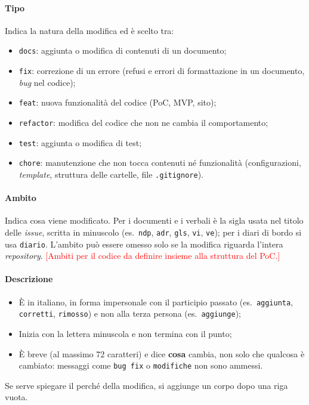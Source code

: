 \documentclass[12pt,a4paper]{article}
\newcommand{\ph}[1]{\textcolor{red}{[#1]}}
\newcommand{\tightlist}{\setlength{\itemsep}{1pt}\setlength{\parskip}{0pt}}
\begin{document}
\paragraph{Tipo}
Indica la natura della modifica ed è scelto tra:
\begin{itemize}
\tightlist
\item \texttt{docs}: aggiunta o modifica di contenuti di un documento;
\item \texttt{fix}: correzione di un errore (refusi e errori di formattazione in un documento, \emph{bug} nel codice);
\item \texttt{feat}: nuova funzionalità del codice (PoC, MVP, sito);
\item \texttt{refactor}: modifica del codice che non ne cambia il comportamento;
\item \texttt{test}: aggiunta o modifica di test;
\item \texttt{chore}: manutenzione che non tocca contenuti né funzionalità (configurazioni, \emph{template}, struttura delle cartelle, file \texttt{.gitignore}).
\end{itemize}

\paragraph{Ambito}
Indica cosa viene modificato. Per i documenti e i verbali è la sigla usata nel titolo delle \emph{issue}, scritta in minuscolo (es.\ \texttt{ndp}, \texttt{adr}, \texttt{gls}, \texttt{vi}, \texttt{ve}); per i diari di bordo si usa \texttt{diario}. L'ambito può essere omesso solo se la modifica riguarda l'intera \emph{repository}. \ph{Ambiti per il codice da definire insieme alla struttura del PoC.}

\paragraph{Descrizione}
\begin{itemize}
\tightlist
\item È in italiano, in forma impersonale con il participio passato (es.\ \texttt{aggiunta}, \texttt{corretti}, \texttt{rimosso}) e non alla terza persona (es.\ \texttt{aggiunge});
\item Inizia con la lettera minuscola e non termina con il punto;
\item È breve (al massimo 72 caratteri) e dice \textbf{cosa} cambia, non solo che qualcosa è cambiato: messaggi come \texttt{bug fix} o \texttt{modifiche} non sono ammessi.
\end{itemize}
Se serve spiegare il perché della modifica, si aggiunge un corpo dopo una riga vuota.
\end{document}
